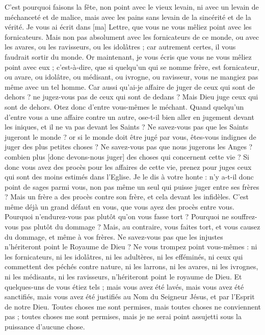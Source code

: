 \begin{multicols}{2}
C'est pourquoi faisons la fête, non point avec le vieux levain, ni avec un levain de méchanceté et de malice, mais avec les pains sans levain de la sincérité et de la vérité.
Je vous ai écrit dans [ma] Lettre, que vous ne vous mêliez point avec les fornicateurs.
Mais non pas absolument avec les fornicateurs de ce monde, ou avec les avares, ou les ravisseurs, ou les idolâtres ; car autrement certes, il vous faudrait sortir du monde.
Or maintenant, je vous écris que vous ne vous mêliez point avec eux ; c'est-à-dire, que si quelqu'un qui se nomme frère, est fornicateur, ou avare, ou idolâtre, ou médisant, ou ivrogne, ou ravisseur, vous ne mangiez pas même avec un tel homme.
Car aussi qu'ai-je affaire de juger de ceux qui sont de dehors ? ne jugez-vous pas de ceux qui sont de dedans ?
Mais Dieu juge ceux qui sont de dehors. Otez donc d'entre vous-mêmes le méchant.
\VerseOne{}Quand quelqu'un d'entre vous a une affaire contre un autre, ose-t-il bien aller en jugement devant les iniques, et il ne va pas devant les Saints ?
Ne savez-vous pas que les Saints jugeront le monde ? or si le monde doit être jugé par vous, êtes-vous indignes de juger des plus petites choses ?
Ne savez-vous pas que nous jugerons les Anges ? combien plus [donc devons-nous juger] des choses qui concernent cette vie ?
Si donc vous avez des procès pour les affaires de cette vie, prenez pour juges ceux qui sont des moins estimés dans l'Eglise.
Je le dis à votre honte : n'y a-t-il donc point de sages parmi vous, non pas même un seul qui puisse juger entre ses frères ?
Mais un frère a des procès contre son frère, et cela devant les infidèles.
C'est même déjà un grand défaut en vous, que vous ayez des procès entre vous. Pourquoi n'endurez-vous pas plutôt qu'on vous fasse tort ? Pourquoi ne souffrez-vous pas plutôt du dommage ?
Mais, au contraire, vous faites tort, et vous causez du dommage, et même à vos frères.
Ne savez-vous pas que les injustes n'hériteront point le Royaume de Dieu ?
Ne vous trompez point vous-mêmes : ni les fornicateurs, ni les idolâtres, ni les adultères, ni les efféminés, ni ceux qui commettent des péchés contre nature, ni les larrons, ni les avares, ni les ivrognes, ni les médisants, ni les ravisseurs, n'hériteront point le royaume de Dieu.
Et quelques-uns de vous étiez tels ; mais vous avez été lavés, mais vous avez été sanctifiés, mais vous avez été justifiés au Nom du Seigneur Jésus, et par l'Esprit de notre Dieu.
Toutes choses me sont permises, mais toutes choses ne conviennent pas ; toutes choses me sont permises, mais je ne serai point assujetti sous la puissance d'aucune chose.

\end{multicols}
